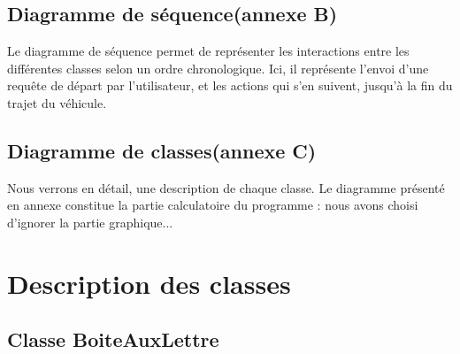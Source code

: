 \documentclass[a4paper, titlepage]{report}
\begin{document}
\section{Diagramme de séquence(annexe B)}
\hspace{0.5cm} Le diagramme de séquence permet de représenter les interactions entre les différentes classes selon un ordre chronologique. Ici, il représente l'envoi d'une requête de départ par l'utilisateur, et les actions qui s'en suivent, jusqu'à la fin du trajet du véhicule.
\section{Diagramme de classes(annexe C)}
\hspace{0.5cm} Nous verrons en détail, une description de chaque classe. Le diagramme présenté en annexe constitue la partie calculatoire du programme : nous avons choisi d'ignorer la partie graphique...

\chapter{Description des classes}
\section{Classe BoiteAuxLettre}
     
\end{document}

